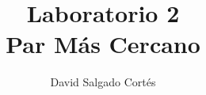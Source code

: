 \documentclass[journal,onecolumn]{IEEEtran}	%
\begin{document}
\title{Laboratorio 2 \\ Par Más Cercano}%
\author{David Salgado Cortés}%
\maketitle				%









\end{document}
